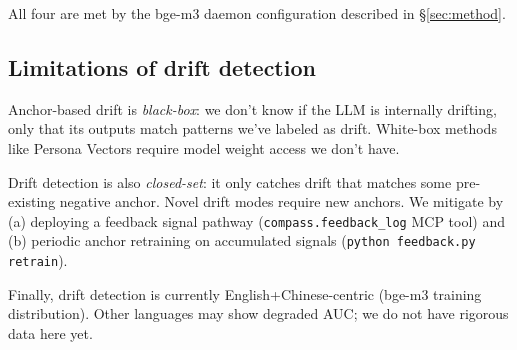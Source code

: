 All four are met by the bge-m3 daemon configuration described in
\S\ref{sec:method}.

\subsection{Limitations of drift detection}

Anchor-based drift is \emph{black-box}: we don't know if the LLM is
internally drifting, only that its outputs match patterns we've labeled
as drift. White-box methods like Persona Vectors
\citep{anthropic2025persona} require model weight access we don't have.

Drift detection is also \emph{closed-set}: it only catches drift that
matches some pre-existing negative anchor. Novel drift modes require
new anchors. We mitigate by (a) deploying a feedback signal pathway
(\texttt{compass.feedback\_log} MCP tool) and (b) periodic anchor
retraining on accumulated signals (\texttt{python feedback.py
retrain}).

Finally, drift detection is currently English+Chinese-centric (bge-m3
training distribution). Other languages may show degraded AUC; we
do not have rigorous data here yet.
